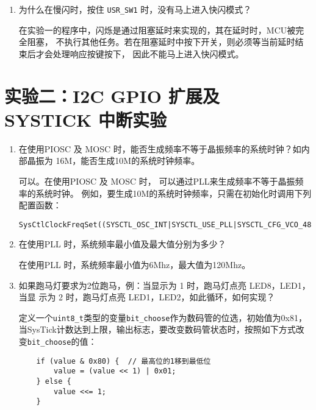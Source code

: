 \documentclass[12pt, a4paper, oneside]{ctexart}
\begin{document}
\begin{enumerate}[listparindent=2em]
        \item 为什么在慢闪时，按住 \verb|USR_SW1| 时，没有马上进入快闪模式？
        
        {\kaishu 在实验一的程序中，闪烁是通过阻塞延时来实现的，其在延时时，MCU被完全阻塞，
        不执行其他任务。若在阻塞延时中按下开关，则必须等当前延时结束后才会处理响应按键按下，
        因此不能马上进入快闪模式。}

       
        
       
       

    \end{enumerate}

    \section{实验二：I2C GPIO 扩展及 SYSTICK 中断实验}
    \begin{enumerate}[listparindent=2em]
        \item  在使用PIOSC 及 MOSC 时，能否生成频率不等于晶振频率的系统时钟？如内部晶振为
        16M，能否生成10M的系统时钟频率。

        {\kaishu 可以。在使用PIOSC 及 MOSC 时，
        可以通过PLL来生成频率不等于晶振频率的系统时钟。
        例如，要生成10M的系统时钟频率，只需在初始化时调用下列配置函数：
        \begin{lstlisting}
SysCtlClockFreqSet((SYSCTL_OSC_INT|SYSCTL_USE_PLL|SYSCTL_CFG_VCO_480),10000000);
        \end{lstlisting}
        }

        \item 在使用PLL 时，系统频率最小值及最大值分别为多少？
        
        {\kaishu 在使用PLL 时，系统频率最小值为6Mhz，最大值为120Mhz。}
        
        \item 如果跑马灯要求为2位跑马，例：当显示为 1 时，跑马灯点亮 LED8，LED1，当显
        示为 2 时，跑马灯点亮 LED1，LED2，如此循环，如何实现？

        {\kaishu 定义一个\verb|uint8_t|类型的变量\verb|bit_choose|作为数码管的位选，初始值为0x81，
        当SysTick计数达到上限，输出标志，要改变数码管状态时，按照如下方式改变\verb|bit_choose|的值：}

        \begin{lstlisting}
    if (value & 0x80) {  // 最高位的1移到最低位
        value = (value << 1) | 0x01;  
    } else {
        value <<= 1; 
    }
    \end{lstlisting}


\end{enumerate}
\end{document}
